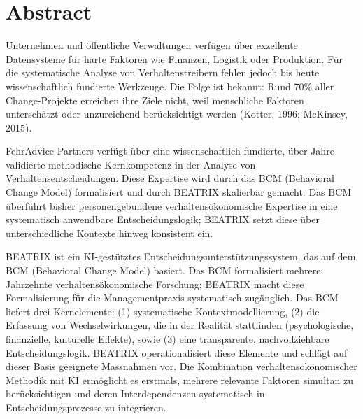 \documentclass[11pt,a4paper]{article}
\begin{document}

\tableofcontents
\newpage


\section*{Abstract}

Unternehmen und öffentliche Verwaltungen verfügen über exzellente Datensysteme für harte Faktoren wie Finanzen, Logistik oder Produktion. Für die systematische Analyse von Verhaltenstreibern fehlen jedoch bis heute wissenschaftlich fundierte Werkzeuge. Die Folge ist bekannt: Rund 70\% aller Change-Projekte erreichen ihre Ziele nicht, weil menschliche Faktoren unterschätzt oder unzureichend berücksichtigt werden (Kotter, 1996; McKinsey, 2015).

FehrAdvice Partners verfügt über eine wissenschaftlich fundierte, über Jahre validierte methodische Kernkompetenz in der Analyse von Verhaltensentscheidungen. Diese Expertise wird durch das BCM (Behavioral Change Model) formalisiert und durch BEATRIX skalierbar gemacht. Das BCM überführt bisher personengebundene verhaltensökonomische Expertise in eine systematisch anwendbare Entscheidungslogik; BEATRIX setzt diese über unterschiedliche Kontexte hinweg konsistent ein.

BEATRIX ist ein KI-gestütztes Entscheidungsunterstützungssystem, das auf dem BCM (Behavioral Change Model) basiert. Das BCM formalisiert mehrere Jahrzehnte verhaltensökonomische Forschung; BEATRIX macht diese Formalisierung für die Managementpraxis systematisch zugänglich. Das BCM liefert drei Kernelemente: (1) systematische Kontextmodellierung, (2) die Erfassung von Wechselwirkungen, die in der Realität stattfinden (psychologische, finanzielle, kulturelle Effekte), sowie (3) eine transparente, nachvollziehbare Entscheidungslogik. BEATRIX operationalisiert diese Elemente und schlägt auf dieser Basis geeignete Massnahmen vor. Die Kombination verhaltensökonomischer Methodik mit KI ermöglicht es erstmals, mehrere relevante Faktoren simultan zu berücksichtigen und deren Interdependenzen systematisch in Entscheidungsprozesse zu integrieren.
\end{document}
